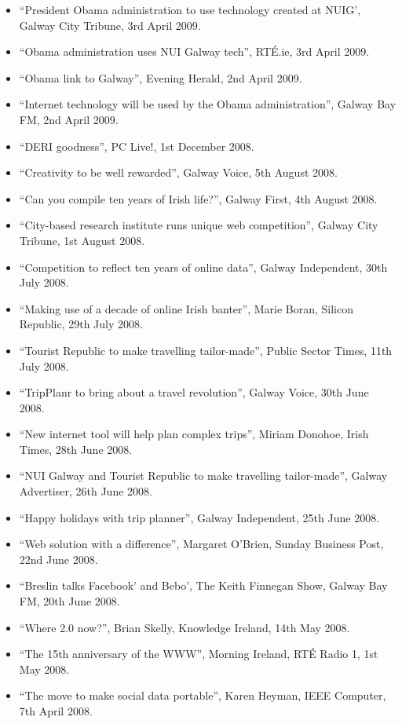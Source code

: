\documentclass[10pt,a4paper]{res} %
\begin{document}
\begin{resume}
{\begin{itemize}
\item ``President Obama administration to use technology created at NUIG', Galway City Tribune, 3rd April 2009.
\item ``Obama administration uses NUI Galway tech'', RT\'{E}.ie, 3rd April 2009.
\item ``Obama link to Galway'', Evening Herald, 2nd April 2009.
\item ``Internet technology will be used by the Obama administration'', Galway Bay FM, 2nd April 2009.
\item ``DERI goodness'', PC Live!, 1st December 2008.
\item ``Creativity to be well rewarded'', Galway Voice, 5th August 2008.
\item ``Can you compile ten years of Irish life?'', Galway First, 4th August 2008.
\item ``City-based research institute runs unique web competition'', Galway City Tribune, 1st August 2008.
\item ``Competition to reflect ten years of online data'', Galway Independent, 30th July 2008.
\item ``Making use of a decade of online Irish banter'', Marie Boran, Silicon Republic, 29th July 2008.
\item ``Tourist Republic to make travelling tailor-made'', Public Sector Times, 11th July 2008.
\item ``TripPlanr to bring about a travel revolution'', Galway Voice, 30th June 2008.
\item ``New internet tool will help plan complex trips'', Miriam Donohoe, Irish Times, 28th June 2008.
\item ``NUI Galway and Tourist Republic to make travelling tailor-made'', Galway Advertiser, 26th June 2008.
\item ``Happy holidays with trip planner'', Galway Independent, 25th June 2008.
\item ``Web solution with a difference'', Margaret O'Brien, Sunday Business Post, 22nd June 2008.
\item ``Breslin talks Facebook' and Bebo', The Keith Finnegan Show, Galway Bay FM, 20th June 2008.
\item ``Where 2.0 now?'', Brian Skelly, Knowledge Ireland, 14th May 2008.
\item ``The 15th anniversary of the WWW'', Morning Ireland, RT\'{E} Radio 1, 1st May 2008.
\item ``The move to make social data portable'', Karen Heyman, IEEE Computer, 7th April 2008.

\end{itemize}}
\end{resume}
\end{document}
